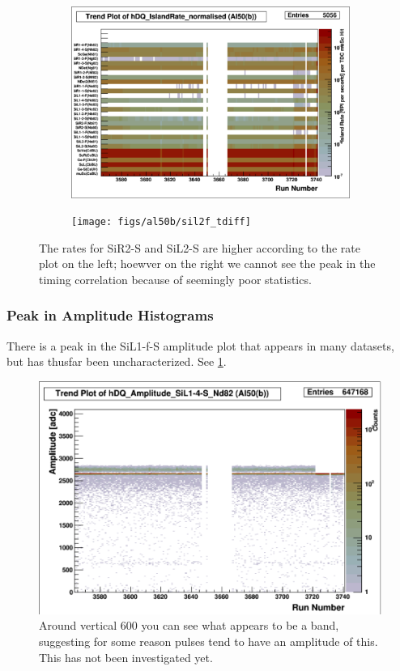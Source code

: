 \documentclass[a4paper]{article}
\begin{document}
\begin{figure}
  \centering
  \begin{subfigure}{0.5\textwidth}
    \includegraphics[width=0.9\linewidth]{figs/al50b/rates}
  \end{subfigure}%
  \begin{subfigure}{0.5\textwidth}
    \texttt{[image: figs/al50b/sil2f\_tdiff]}
  \end{subfigure}
  \caption{The rates for SiR2-S and SiL2-S are higher according to the rate plot on the left;
    hoewver on the right we cannot see the peak in the timing correlation because of
    seemingly poor statistics.}
\end{figure}


\subsubsection{Peak in Amplitude Histograms}

There is a peak in the SiL1-f-S amplitude plot that appears in many datasets, but has
thusfar been uncharacterized. See \ref{fig:sil14s_amp}.

\begin{figure}
  \centering
  \includegraphics[width=0.9\linewidth]{figs/al50b/sil14s_amp}
  \caption{Around vertical 600 you can see what appears to be a band,
    suggesting for some reason pulses tend to have an amplitude of this.
    This has not been investigated yet.}
  \label{fig:sil14s_amp}
\end{figure}
\end{document}
